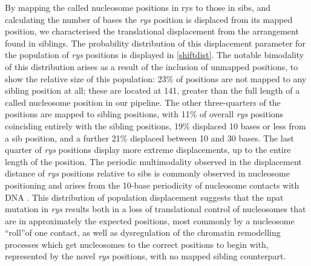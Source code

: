 By mapping the called nucleosome positions in rys to those in sibs, and calculating the number of bases the \textit{rys} position is displaced from its mapped position, we characterised the translational displacement from the arrangement found in siblings. The probability distribution of this displacement parameter for the population of \textit{rys} positions is displayed in \autoref{shiftdist}. The notable bimodality of this distribution arises as a result of the inclusion of unmapped positions, to show the relative size of this population: 23\% of positions are not mapped to any sibling position at all; these are located at 141, greater than the full length of a called nucleosome position in our pipeline. The other three-quarters of the positions are mapped to sibling positions, with 11\% of overall \textit{rys} positions coinciding entirely with the sibling positions, 19\% displaced 10 bases or less from a sib position, and a further 21\% displaced between 10 and 30 bases. The last quarter of \textit{rys} positions display more extreme displacements, up to the entire length of the position. The periodic multimodality observed in the displacement distance of \textit{rys} positions relative to sibs is commonly observed in nucleosome positioning and arises from the 10-base periodicity of nucleosome contacts with DNA \cite{Wright2017}. This distribution of population displacement suggests that the npat mutation in \textit{rys} results both in a loss of translational control of nucleosomes that are in approximately the expected positions, most commonly by a nucleosome ``roll''of one contact, as well as dysregulation of the chromatin remodelling processes which get nucleosomes to the correct positions to begin with, represented by the novel \textit{rys} positions, with no mapped sibling counterpart.

